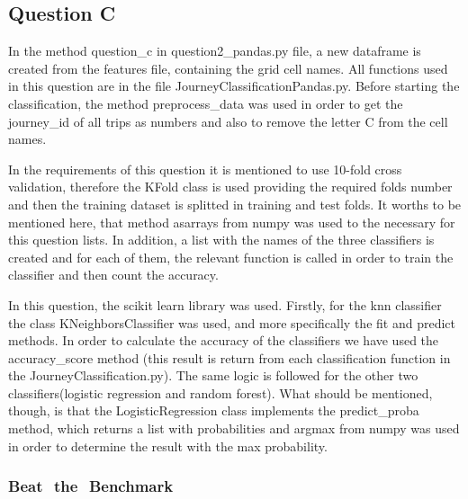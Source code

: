 \documentclass[12pt]{article}
\begin{document}
	\subsection{Question C}
	In the method question\_c in question2\_pandas.py file, a new dataframe is created from the features file, containing the grid cell names. All functions used in this question are in the file JourneyClassificationPandas.py. Before starting the classification, the method preprocess\_data was used in order to get the journey\_id of all trips as numbers and also to remove the letter C from the cell names.
	
	In the requirements of this question it is mentioned to use 10-fold cross validation, therefore the KFold class is used providing the required folds number and then the training dataset is splitted in training and test folds. It worths to be mentioned here, that method asarrays from numpy was used to the necessary for this question lists. In addition, a list with the names of the three classifiers is created and for each of them, the relevant function is called in order to train the classifier and then count the accuracy. 
	
	In this question, the scikit learn library was used. Firstly, for the knn classifier the class KNeighborsClassifier was used, and more specifically the fit and predict methods. In order to calculate the accuracy of the classifiers we have used the accuracy\_score method (this result is return from each classification function in the JourneyClassification.py). The same logic is followed for the other two classifiers(logistic regression and random forest). What should be mentioned, though, is that the LogisticRegression class implements the predict\_proba method, which returns a list with probabilities and argmax from numpy was used in order to determine the result with the max probability.
	
	\subsubsection{Beat ​ ​the ​ ​Benchmark}
	
\end{document}
